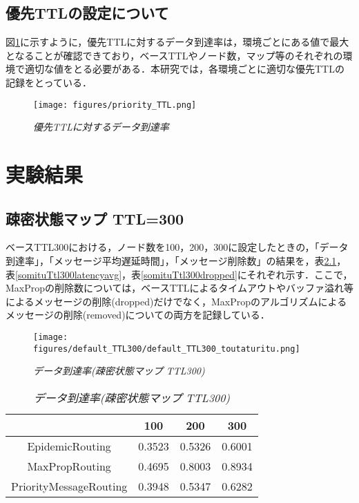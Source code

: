 \documentclass[11pt]{icsthesis}
\begin{document}
\section{優先TTLの設定について}
図\ref{priorityTTL}に示すように，優先TTLに対するデータ到達率は，環境ごとにある値で最大となることが確認できており，ベースTTLやノード数，マップ等のそれぞれの環境で適切な値をとる必要がある．本研究では，各環境ごとに適切な優先TTLの記録をとっている．
\begin{figure}[H]
	\centering
	\texttt{[image: figures/priority\_TTL.png]}
	\caption[]{\it{優先TTLに対するデータ到達率}}
	\label{priorityTTL}
\end{figure}
\chapter{実験結果}

\section{疎密状態マップ TTL=300}
ベースTTL300における，ノード数を100，200，300に設定したときの，「データ到達率」，「メッセージ平均遅延時間」，「メッセージ削除数」の結果を，表\ref{somituTtl300deliveryprob}，表\ref{somituTtl300latencyavg}，表\ref{somituTtl300dropped}にそれぞれ示す．ここで，MaxPropの削除数については，ベースTTLによるタイムアウトやバッファ溢れ等によるメッセージの削除(dropped)だけでなく，MaxPropのアルゴリズムによるメッセージの削除(removed)についての両方を記録している．

\begin{figure}[h]
\centering
\texttt{[image: figures/default\_TTL300/default\_TTL300\_toutaturitu.png]}
\caption[]{\it{データ到達率(疎密状態マップ TTL300)}}
\label{somituttl300deliveryprobgraph}
\end{figure}

\begin{table}[H]
 \begin{center}
      \caption[]{\it{データ到達率(疎密状態マップ TTL300)}}
      \label{somituTtl300deliveryprob}
      \begin{tabular}{|c|c|c|c|}
\hline
&100&200&300\\
\hline
EpidemicRouting&0.3523&0.5326&0.6001\\
\hline
MaxPropRouting&0.4695&0.8003&0.8934\\
\hline
PriorityMessageRouting&0.3948&0.5347&0.6282\\
\hline
      \end{tabular}
    \end{center}
\end{table}
\end{document}
